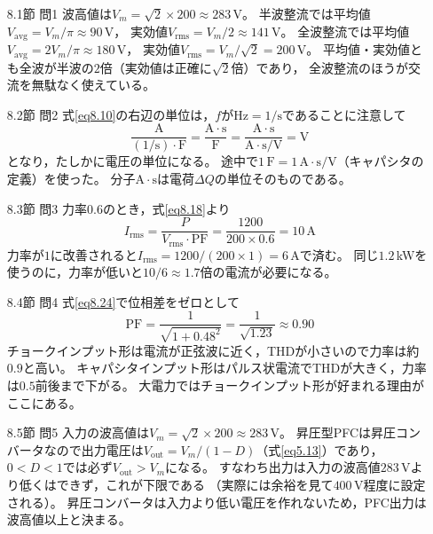 \answer
\begin{enumerate}

\item[8.1節 問1]
波高値は$V_m = \sqrt{2}\times200 \approx 283$\,V。
半波整流では平均値$V_{\mathrm{avg}} = V_m/\pi \approx 90$\,V，
実効値$V_{\mathrm{rms}} = V_m/2 \approx 141$\,V。
全波整流では平均値$V_{\mathrm{avg}} = 2V_m/\pi \approx 180$\,V，
実効値$V_{\mathrm{rms}} = V_m/\sqrt{2} = 200$\,V。
平均値・実効値とも全波が半波の$2$倍（実効値は正確に$\sqrt{2}$倍）であり，
全波整流のほうが交流を無駄なく使えている。

\item[8.2節 問2]
式\ref{eq8.10}の右辺の単位は，$f$が$\mathrm{Hz} = 1/\mathrm{s}$であることに注意して
\begin{equation*}
\frac{\mathrm{A}}{(1/\mathrm{s})\cdot\mathrm{F}}
= \frac{\mathrm{A}\cdot\mathrm{s}}{\mathrm{F}}
= \frac{\mathrm{A}\cdot\mathrm{s}}{\mathrm{A}\cdot\mathrm{s}/\mathrm{V}} = \mathrm{V}
\end{equation*}
となり，たしかに電圧の単位になる。
途中で$1\,\mathrm{F} = 1\,\mathrm{A\cdot s/V}$（キャパシタの定義）を使った。
分子$\mathrm{A}\cdot\mathrm{s}$は電荷$\mathit{\Delta}Q$の単位そのものである。

\item[8.3節 問3]
力率$0.6$のとき，式\ref{eq8.18}より
\begin{equation*}
I_{\mathrm{rms}} = \frac{P}{V_{\mathrm{rms}}\cdot\mathrm{PF}}
= \frac{1200}{200\times0.6} = 10\,\mathrm{A}
\end{equation*}
力率が$1$に改善されると$I_{\mathrm{rms}} = 1200/(200\times1) = 6$\,Aで済む。
同じ$1.2$\,kWを使うのに，力率が低いと$10/6 \approx 1.7$倍の電流が必要になる。

\item[8.4節 問4]
式\ref{eq8.24}で位相差をゼロとして
\begin{equation*}
\mathrm{PF} = \frac{1}{\sqrt{1 + 0.48^2}}
= \frac{1}{\sqrt{1.23}} \approx 0.90
\end{equation*}
チョークインプット形は電流が正弦波に近く，THDが小さいので力率は約$0.9$と高い。
キャパシタインプット形はパルス状電流でTHDが大きく，力率は$0.5$前後まで下がる。
大電力ではチョークインプット形が好まれる理由がここにある。

\item[8.5節 問5]
入力の波高値は$V_m = \sqrt{2}\times200 \approx 283$\,V。
昇圧型PFCは昇圧コンバータなので出力電圧は$V_{\mathrm{out}} = V_m/(1-D)$（式\ref{eq5.13}）であり，
$0 < D < 1$では必ず$V_{\mathrm{out}} > V_m$になる。
すなわち出力は入力の波高値$283$\,Vより低くはできず，これが下限である
（実際には余裕を見て$400$\,V程度に設定される）。
昇圧コンバータは入力より低い電圧を作れないため，PFC出力は波高値以上と決まる。

\end{enumerate}
